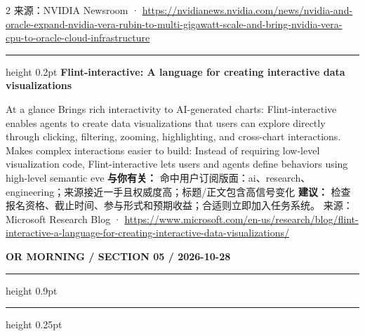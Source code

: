 \documentclass[10.5pt]{ctexart}
\begin{document}
\begin{multicols}{2}
{\footnotesize\color{ormuted} 来源：NVIDIA Newsroom · \url{https://nvidianews.nvidia.com/news/nvidia-and-oracle-expand-nvidia-vera-rubin-to-multi-gigawatt-scale-and-bring-nvidia-vera-cpu-to-oracle-cloud-infrastructure}}
\vspace{2mm}
\hrule height 0.2pt
\vspace{2mm}
{\large\bfseries Flint-interactive: A language for creating interactive data visualizations}\par
At a glance Brings rich interactivity to AI-generated charts: Flint-interactive enables agents to create data visualizations that users can explore directly through clicking, filtering, zooming, highlighting, and cross-chart interactions. Makes complex interactions easier to build: Instead of requiring low-level visualization code, Flint-interactive lets users and agents define behaviors using high-level semantic eve
\textbf{与你有关：} 命中用户订阅版面：ai、research、engineering；来源接近一手且权威度高；标题/正文包含高信号变化
\textbf{建议：} 检查报名资格、截止时间、参与形式和预期收益；合适则立即加入任务系统。
{\footnotesize\color{ormuted} 来源：Microsoft Research Blog · \url{https://www.microsoft.com/en-us/research/blog/flint-interactive-a-language-for-creating-interactive-data-visualizations/}}
\end{multicols}
\newpage
{\small\bfseries OR MORNING / SECTION 05 / 2026-10-28}
\vspace{2mm}
\hrule height 0.9pt
\vspace{1.5mm}
\hrule height 0.25pt
\vspace{4mm}
\end{document}
